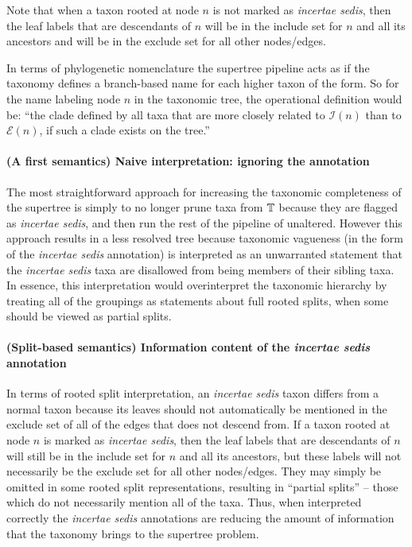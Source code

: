\documentclass[english]{article}
\begin{document}
Note that when a taxon rooted at node $n$ is not marked as \emph{incertae sedis},
then the leaf labels that are descendants of $n$ will be in the include set for
$n$ and all its ancestors and will be in the exclude set for all other nodes/edges.

In terms of phylogenetic nomenclature the supertree pipeline acts as if the
taxonomy defines a branch-based name \citep[see][]{deQueiroz2013} for each
higher taxon of the form. So for the name labeling node $n$ in the taxonomic
tree, the operational definition would be: ``the clade defined by all taxa that
are more closely related to $\mathcal{I}(n)$ than to $\mathcal{E}(n)$, if such a clade exists on the tree.''


\paragraph{(A first semantics) Naive interpretation: ignoring the annotation}

The most straightforward approach for increasing the taxonomic
completeness of the supertree is simply to no longer prune taxa from
$\mbox{\ensuremath{\mathbb{T}}}$ because they are flagged as \emph{incertae sedis}, and
then run the rest of the pipeline of \citet{redelings2017supertree}
unaltered.
However this approach results in a less resolved tree
because taxonomic vagueness (in the form of the \emph{incertae sedis}
annotation) is interpreted as an unwarranted statement that the
\emph{incertae sedis} taxa are disallowed from being members of their
sibling taxa.
In essence, this interpretation would overinterpret the taxonomic
    hierarchy by treating all of the groupings as statements about
    full rooted splits, when some should be viewed as partial splits.



\paragraph{(Split-based semantics) Information content of the \emph{incertae sedis} annotation}

In terms of rooted split interpretation, an \emph{incertae sedis} taxon differs
from a normal taxon because its leaves should not automatically be mentioned in
the exclude set of all of the edges that does not descend from. If a taxon
rooted at node $n$ is marked as \emph{incertae sedis}, then the leaf labels that
are descendants of $n$ will still be in the include set for $n$ and all its ancestors,
but these labels will not necessarily be the exclude set for all other
nodes/edges. They may simply be omitted in some rooted split representations,
resulting in ``partial splits'' -- those which do not necessarily mention all of
the taxa. Thus, when interpreted correctly the \emph{incertae sedis} annotations
are reducing the amount of information that the taxonomy brings to the supertree
problem.
\end{document}
